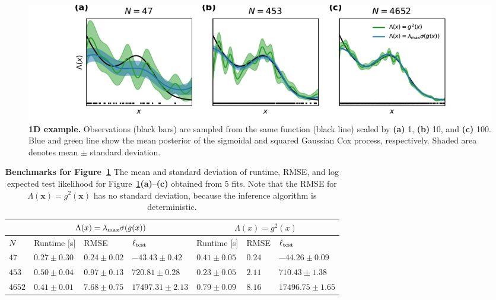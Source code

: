 \documentclass[twoside,11pt]{article}
\newcommand{\bx}{\boldsymbol{x}}
\begin{document}
\begin{figure}
\centering
\includegraphics[width=\textwidth]{figures/lloyd_1d.pdf}
\caption{{\bf 1D example.} Observations (black bars) are sampled from the same function (black line) scaled by {\bf (a)} 1, {\bf (b)} 10, and {\bf (c)} 100. Blue and green line show the mean posterior of the sigmoidal and squared Gaussian Cox process, respectively. Shaded area denotes mean $\pm$ standard deviation.}\label{fig:fig5}
\end{figure}

\begin{table}[]
\begin{tabular}{l|lll|lll}
         & \multicolumn{3}{c|}{$\Lambda(x) = \lambda_{\rm max}\sigma(g(x))$} & \multicolumn{3}{c}{$\Lambda(x) = g^2(x)$}   \\ \hline
 $N$        & Runtime {[}s{]}     & RMSE              & $\ell_{\rm test}$      & Runtime {[}s{]} & RMSE & $\ell_{\rm test}$  \\ \hline
$47$   & $0.27\pm0.30$       & $0.24\pm 0.02$    & $-43.43 \pm 0.42$      & $0.41\pm 0.05$  &  $0.24$   & $-44.26 \pm 0.09$  \\
$453$  & $0.50\pm 0.04$      & $0.97\pm 0.13$    & $720.81 \pm 0.28$      & $0.23\pm 0.05$  &   $2.11$   & $710.43\pm1.38$    \\
$4652$ & $0.41\pm 0.01$      & $7.68\pm0.75$     & $17497.31 \pm 2.13$    & $0.79\pm 0.09$  &  $8.16$    & $17496.75\pm 1.65$ \\
\hline
\end{tabular}
\caption{{\bf Benchmarks for Figure~\ref{fig:fig5}} The mean and standard deviation of runtime, RMSE, and log expected test likelihood for Figure~\ref{fig:fig5}{\bf (a)}--{\bf (c)} obtained from $5$ fits. Note that the RMSE for $\Lambda(\bx)=g^2(\bx)$ has no standard deviation, because the inference algorithm is deterministic.}\label{tab:table1}
\end{table}
\end{document}
